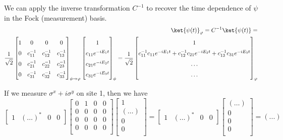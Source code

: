 We can apply the inverse transformation $C^{-1}$ to recover the time dependence of $\psi$ in the Fock (measurement) basis.
\begin{equation*}
    \begin{aligned}
    \ket{\psi(t)}_{\varphi} =
    C^{-1}\ket{\psi(t)}= \\
    \frac{1}{\sqrt{2}}
    \renewcommand*{\arraystretch}{1.5}
    \begin{bmatrix}
        1 & 0 & 0 & 0 \\
        0 & c^{-1}_{11} & c^{-1}_{12} & c^{-1}_{13} \\
        0 & c^{-1}_{21} & c^{-1}_{22} & c^{-1}_{23} \\
        0 & c^{-1}_{31} & c^{-1}_{32} & c^{-1}_{33} \\
    \end{bmatrix}_{\phi \rightarrow \varphi}
    \begin{bmatrix}
        1 \\
        c_{11} e^{-i E_1 t} \\
        c_{21} e^{-i E_2 t} \\
        c_{31} e^{-i E_3 t}\\
    \end{bmatrix}_{\phi}
    =
    \frac{1}{\sqrt{2}}
    \begin{bmatrix}
        1 \\
        c^{-1}_{11} c_{11} e^{-i E_1 t} +  c^{-1}_{12} c_{21} e^{-i E_2 t} + c^{-1}_{13} c_{31} e^{-i E_3 t} \\
        \ldots \\
        \ldots \\
    \end{bmatrix}_{\varphi}
\end{aligned}
\end{equation*}

If we measure $\sigma^x + i \sigma^y$ on site 1, then we have
\begin{equation}
\begin{bmatrix}
1 & (\ldots)^* & 0 & 0
\end{bmatrix}
\begin{bmatrix}
0 & 1 & 0 & 0 \\
0 & 0 & 0 & 0 \\
0 & 0 & 0 & 0 \\
0 & 0 & 0 & 0 \\
\end{bmatrix}
\begin{bmatrix}
1 \\
(\ldots) \\
0 \\
0 \\
\end{bmatrix}
=
\begin{bmatrix}
1 & (\ldots)^* & 0 & 0
\end{bmatrix}
\begin{bmatrix}
(\ldots) \\
0 \\
0 \\
0 \\
\end{bmatrix}
= (...)
\end{equation}

